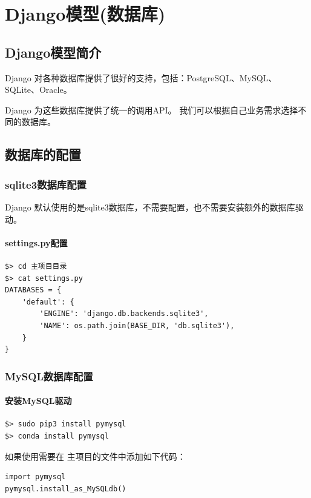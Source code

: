 \chapter{Django模型(数据库)}

\section{Django模型简介}
Django 对各种数据库提供了很好的支持，包括：PostgreSQL、MySQL、SQLite、Oracle。

Django 为这些数据库提供了统一的调用API。 我们可以根据自己业务需求选择不同的数据库。


\section{数据库的配置}
\subsection{sqlite3数据库配置}
Django 默认使用的是sqlite3数据库，不需要配置，也不需要安装额外的数据库驱动。
\subsubsection{settings.py配置}
\begin{lstlisting}[style=demostyle,numbers=none]
$> cd 主项目目录
$> cat settings.py
DATABASES = {
    'default': {
        'ENGINE': 'django.db.backends.sqlite3',
        'NAME': os.path.join(BASE_DIR, 'db.sqlite3'),
    }
}
\end{lstlisting}    

\subsection{MySQL数据库配置}
\subsubsection{安装MySQL驱动}
\begin{lstlisting}[style=demostyle,numbers=none]
$> sudo pip3 install pymysql
$> conda install pymysql
\end{lstlisting}

如果使用需要在 \textcolor{YBXPurple}{主项目}的文件中添加如下代码：
\begin{lstlisting}[style=demostyle,numbers=none]
import pymysql
pymysql.install_as_MySQLdb()
\end{lstlisting}    

